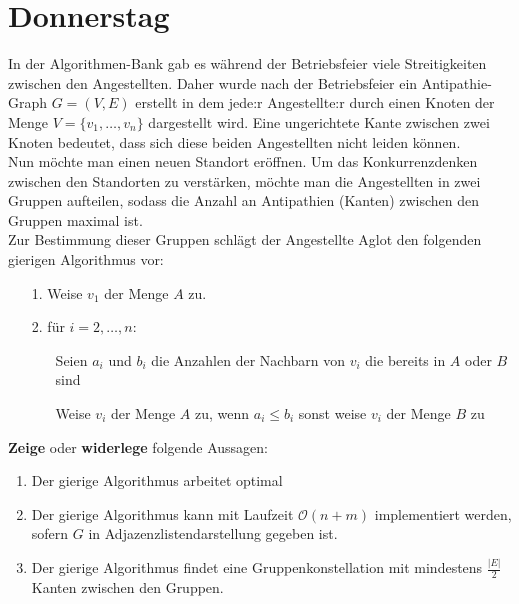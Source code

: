 \documentclass{uebung_cs}
\begin{document}
\section*{Donnerstag}
\begin{aufgabe}[Antipathien]
    In der Algorithmen-Bank gab es während der Betriebsfeier viele Streitigkeiten zwischen den Angestellten. Daher wurde nach der Betriebsfeier ein Antipathie-Graph $G=(V,E)$ erstellt in dem jede:r Angestellte:r durch einen Knoten der Menge $V=\{v_1,\ldots , v_n\}$ dargestellt wird. Eine ungerichtete Kante zwischen zwei Knoten bedeutet, dass sich diese beiden Angestellten nicht leiden können.\\
    Nun möchte man einen neuen Standort eröffnen. Um das Konkurrenzdenken zwischen den Standorten zu verstärken, möchte man die Angestellten in zwei Gruppen aufteilen, sodass die Anzahl an Antipathien (Kanten) zwischen den Gruppen maximal ist.\\
    Zur Bestimmung dieser Gruppen schlägt der Angestellte Aglot den folgenden gierigen Algorithmus vor:
    \begin{enumerate}
        \item[1.] Weise $v_1$ der Menge $A$ zu.
        \item[2.] für $i=2,\ldots , n$:
        \begin{itemize}
            \item[] Seien $a_i$ und $b_i$ die Anzahlen der Nachbarn von $v_i$ die bereits in $A$ oder $B$ sind
            \item[] Weise $v_i$ der Menge $A$ zu, wenn $a_i \leq b_i$ sonst weise $v_i$ der Menge $B$ zu 
        \end{itemize}
    \end{enumerate}
    \textbf{Zeige} oder \textbf{widerlege} folgende Aussagen:
    \begin{enumerate}[label=(\alph*)]
        \item Der gierige Algorithmus arbeitet optimal
        \item Der gierige Algorithmus kann mit Laufzeit $\mathcal{O}(n+m)$ implementiert werden, sofern $G$ in Adjazenzlistendarstellung gegeben ist.
        \item Der gierige Algorithmus findet eine Gruppenkonstellation mit mindestens $\frac{|E|}{2}$ Kanten zwischen den Gruppen.
    \end{enumerate}
\end{aufgabe}
\end{document}
